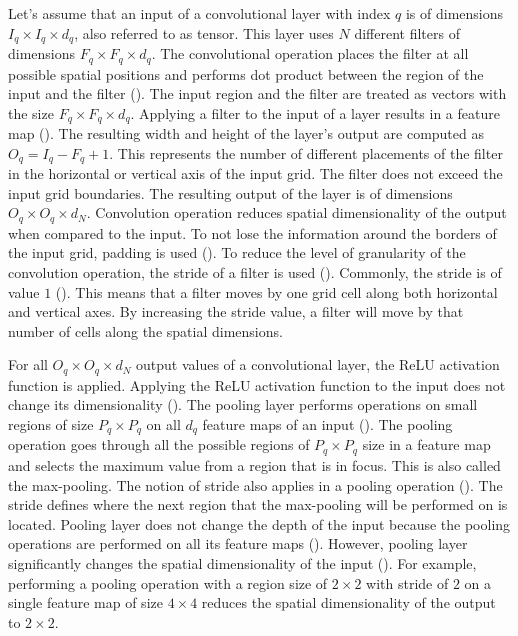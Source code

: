 \documentclass{BachelorBUI}
\begin{document}
                Let's assume that an input of a convolutional layer with index $q$ is of dimensions $I_{q} \times I_{q} \times d_q$, also referred to as tensor. This layer uses $N$ different filters of dimensions $F_{q} \times F_{q} \times d_q$. The convolutional operation places the filter at all possible spatial positions and performs dot product between the region of the input and the filter (\cite{Aggarwal:2018}). The input region and the filter are treated as vectors with the size $F_{q} \times F_{q} \times d_q$. Applying a filter to the input of a layer results in a feature map (\cite{Aggarwal:2018}). The resulting width and height of the layer's output are computed as $O_{q} = I_{q} - F_{q} + 1$. This represents the number of different placements of the filter in the horizontal or vertical axis of the input grid. The filter does not exceed the input grid boundaries. The resulting output of the layer is of dimensions $O_{q} \times O_{q} \times d_N$. Convolution operation reduces spatial dimensionality of the output when compared to the input. To not lose the information around the borders of the input grid, padding is used (\cite{Aggarwal:2018}). To reduce the level of granularity of the convolution operation, the stride of a filter is used (\cite{Aggarwal:2018}). Commonly, the stride is of value $1$ (\cite{Aggarwal:2018}). This means that a filter moves by one grid cell along both horizontal and vertical axes. By increasing the stride value, a filter will move by that number of cells along the spatial dimensions.

                For all $O_{q} \times O_{q} \times d_N$ output values of a convolutional layer, the ReLU activation function is applied. Applying the ReLU activation function to the input does not change its dimensionality (\cite{Aggarwal:2018}). The pooling layer performs operations on small regions of size $P_{q} \times P_{q}$ on all $d_{q}$ feature maps of an input (\cite{Aggarwal:2018}). The pooling operation goes through all the possible regions of $P_{q} \times P_{q}$ size in a feature map and selects the maximum value from a region that is in focus. This is also called the max-pooling. The notion of stride also applies in a pooling operation (\cite{Aggarwal:2018}). The stride defines where the next region that the max-pooling will be performed on is located. Pooling layer does not change the depth of the input because the pooling operations are performed on all its feature maps (\cite{Aggarwal:2018}). However, pooling layer significantly changes the spatial dimensionality of the input (\cite{Aggarwal:2018}). For example, performing a pooling operation with a region size of $2 \times 2$ with stride of $2$ on a single feature map of size $4 \times 4$ reduces the spatial dimensionality of the output to $2 \times 2$.
\end{document}
